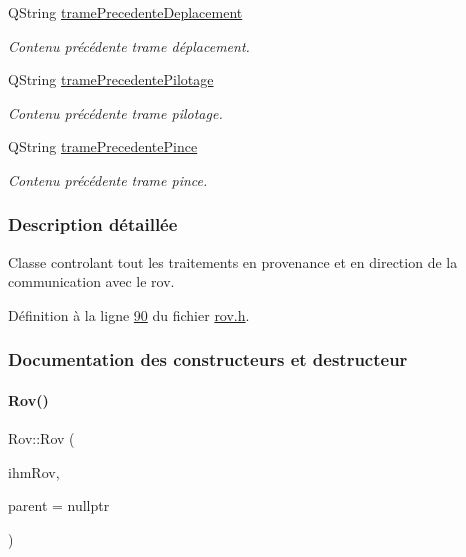 \begin{DoxyCompactItemize}
Q\+String \hyperlink{class_rov_a6e42b166c837f5103b53bb9eae35f087}{trame\+Precedente\+Deplacement}
\begin{DoxyCompactList}\small\item\em Contenu précédente trame déplacement. \end{DoxyCompactList}\item 
Q\+String \hyperlink{class_rov_a12b08128a49ca43fc1198fdeb6a6f0cd}{trame\+Precedente\+Pilotage}
\begin{DoxyCompactList}\small\item\em Contenu précédente trame pilotage. \end{DoxyCompactList}\item 
Q\+String \hyperlink{class_rov_aa8ee68edaa542473e1e5ea6bc24432ce}{trame\+Precedente\+Pince}
\begin{DoxyCompactList}\small\item\em Contenu précédente trame pince. \end{DoxyCompactList}\end{DoxyCompactItemize}


\subsubsection{Description détaillée}
Classe controlant tout les traitements en provenance et en direction de la communication avec le rov. 

Définition à la ligne \hyperlink{rov_8h_source_l00090}{90} du fichier \hyperlink{rov_8h_source}{rov.\+h}.



\subsubsection{Documentation des constructeurs et destructeur}
\mbox{\label{class_rov_a6e893548f3aadca5660540feb74f06f4}} 
\paragraph{\texorpdfstring{Rov()}{Rov()}}
{\footnotesize\ttfamily Rov\+::\+Rov (\begin{DoxyParamCaption}\item[{\hyperlink{class_i_h_m_rov}{I\+H\+M\+Rov} $\ast$}]{ihm\+Rov,  }\item[{\hyperlink{class_q_object}{Q\+Object} $\ast$}]{parent = {\ttfamily nullptr} }\end{DoxyParamCaption})}



